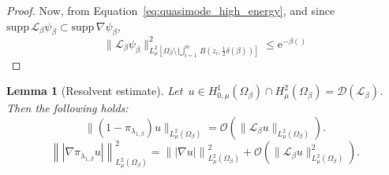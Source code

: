 \documentclass[10pt]{article}
\newcommand{\cL}{\mathcal{L}}
\newcommand{\e}{\mathrm{e}}
\newcommand{\1}{\mathbbm 1}
\newcommand{\supp}{\mathrm{supp}}
\newcommand{\largeRadius}{\delta}
\renewcommand{\O}{\mathcal{O}}
\newtheorem{lemma}{Lemma}
\begin{document}
\begin{proof}
            Now, from Equation~\eqref{eq:quasimode_high_energy}, and since~$\supp\,\cL_\beta \psi_\beta \subset \supp\,\nabla \psi_\beta$, 
            \[\|\cL_\beta \psi_\beta\|^2_{L^2_\mu\left[\Omega_\beta \setminus \bigcup_{i=1}^m\,B\left(z_i,\frac12\largeRadius(\beta)\right)\right]}\leq \e^{-\beta\left(\right)}\]
        \end{proof}

        \begin{lemma}[Resolvent estimate]
            Let~$u\in H_{0,\mu}^1(\Omega_\beta)\cap H^2_\mu(\Omega_\beta) = \mathcal D(\cL_\beta)$. Then the following holds:
            \begin{equation}
                \label{eq:lemma_resolvent_eqa}
                \|(1-\pi_{\lambda_{1,\beta}})u\|_{L^2_\mu(\Omega_\beta)} = \O(\|\cL_\beta u\|_{L^2_\mu(\Omega_\beta)}).
            \end{equation}
            \begin{equation}
                \label{eq:lemma_resolvent_eqb}
                \left\||\nabla \pi_{\lambda_{1,\beta}} u|\right\|_{L^2_\mu(\Omega_\beta)}^2 = \left\||\nabla u|\right\|_{ L^2_\mu(\Omega_\beta)}^2 + \O\left(\|\cL_\beta u\|_{L^2_\mu(\Omega_\beta)}^2\right).
            \end{equation}
        \end{lemma}
\end{document}

